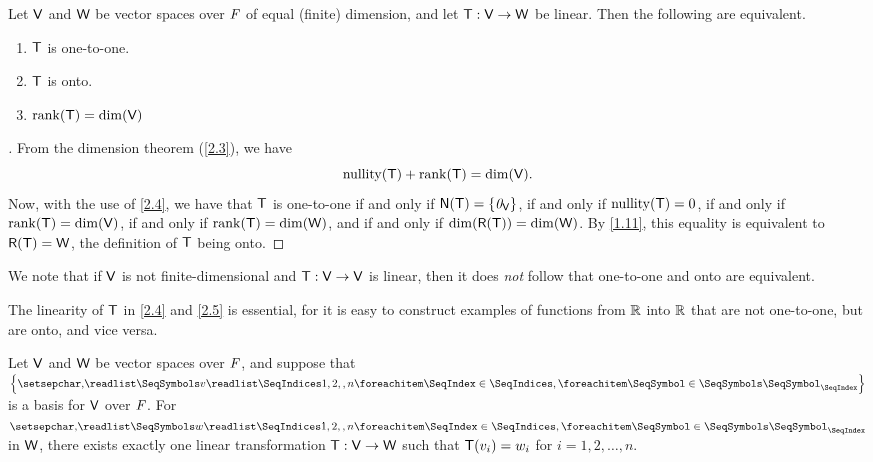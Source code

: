 \begin{thm}\label{2.5}
  Let \(\mathsf{V}\) and \(\mathsf{W}\) be vector spaces over \(\mathit{F}\) of equal (finite) dimension, and let \(\mathsf{T} : \mathsf{V} \to \mathsf{W}\) be linear.
  Then the following are equivalent.
  \begin{enumerate}
    \item \(\mathsf{T}\) is one-to-one.
    \item \(\mathsf{T}\) is onto.
    \item \(\rk{\T} = \dim(\V)\)
  \end{enumerate}
\end{thm}

\begin{proof}[]
  From the dimension theorem (\cref{2.3}), we have
  \[
    \nt{\T} + \rk{\T} = \dim(\V).
  \]
  Now, with the use of \cref{2.4}, we have that \(\mathsf{T}\) is one-to-one if and only if \(\ns{\T} = \set{\zv_{\V}}\), if and only if \(\nt{\T} = 0\), if and only if \(\rk{\T} = \dim(\V)\), if and only if \(\rk{\T} = \dim(\W)\), and if and only if \(\dim(\rg{\T}) = \dim(\W)\).
  By \cref{1.11}, this equality is equivalent to \(\rg{\T} = \W\), the definition of \(\mathsf{T}\) being onto.
\end{proof}

\begin{note}
  We note that if \(\mathsf{V}\) is not finite-dimensional and \(\mathsf{T} : \mathsf{V} \to \mathsf{V}\) is linear, then it does \emph{not} follow that one-to-one and onto are equivalent.

  The linearity of \(\mathsf{T}\) in \cref{2.4} and \cref{2.5} is essential, for it is easy to construct examples of functions from \(\mathbb{R}\) into \(\mathbb{R}\) that are not one-to-one, but are onto, and vice versa.
\end{note}

\begin{thm}\label{2.6}
  Let \(\mathsf{V}\) and \(\mathsf{W}\) be vector spaces over \(\mathit{F}\), and suppose that \(\set{\seq{v}{1,2,,n}}\) is a basis for \(\mathsf{V}\) over \(\mathit{F}\).
  For \(\seq{w}{1,2,,n}\) in \(\mathsf{W}\), there exists exactly one linear transformation \(\mathsf{T} : \mathsf{V} \to \mathsf{W}\) such that \(\mathsf{T}(v_i) = w_i\) for \(i = 1, 2, \dots, n\).
\end{thm}

